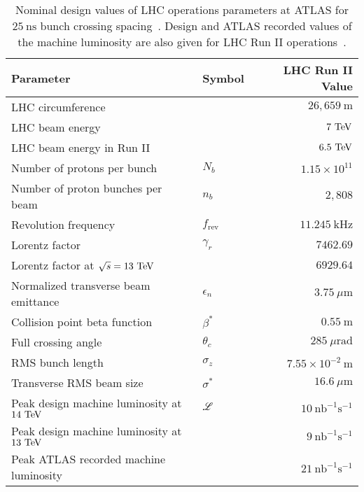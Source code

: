 \begin{table}[htpb]
 \centering
 \caption{Nominal design values of LHC operations parameters at ATLAS for $25~\textrm{ns}$ bunch crossing spacing~\cite{Evans:2008,PhysRevAccelBeams.19.101003}.
  Design and ATLAS recorded values of the machine luminosity are also given for LHC Run II operations~\cite{TWiki:2018ATLASPeakLumi}.
 }
 \begin{tabular}{@{}llr@{}} \toprule
  Parameter                                   & Symbol             & LHC Run II Value                     \\ \midrule
  LHC circumference                           &                    & $26,659~\mathrm{m}$                  \\
  LHC beam energy                             &                    & $7~\mathrm{TeV}$                             \\
  LHC beam energy in Run II                   &                    & $6.5~\mathrm{TeV}$                           \\
  Number of protons per bunch                 & $N_{b}$            & $1.15 \times 10^{11}$                \\
  Number of proton bunches per beam           & $n_{b}$            & $2,808$                              \\
  Revolution frequency                        & $f_{\textrm{rev}}$ & $11.245~\mathrm{kHz}$                \\
  Lorentz factor                              & $\gamma_{r}$       & $7462.69$                            \\
  Lorentz factor at $\sqrt{s} = 13~\mathrm{TeV}$      &                    & $6929.64$                            \\
  Normalized transverse beam emittance        & $\epsilon_{n}$     & $3.75~\mu\mathrm{m}$                 \\
  Collision point beta function               & $\beta^{*}$        & $0.55~\mathrm{m}$                    \\
  Full crossing angle                         & $\theta_{c}$       & $285~\mu\mathrm{rad}$                \\
  RMS bunch length                            & $\sigma_{z}$       & $7.55\times 10^{-2}~\mathrm{m}$      \\
  Transverse RMS beam size                    & $\sigma^{*}$       & $16.6~\mu\mathrm{m}$                 \\ \midrule
  Peak design machine luminosity at $14~\mathrm{TeV}$ & $\mathscr{L}$      & $10~\mathrm{nb}^{-1}\mathrm{s}^{-1}$ \\
  Peak design machine luminosity at $13~\mathrm{TeV}$ &                    & $9~\mathrm{nb}^{-1}\mathrm{s}^{-1}$  \\
  Peak ATLAS recorded machine luminosity      &                    & $21~\mathrm{nb}^{-1}\mathrm{s}^{-1}$ \\
  \bottomrule
 \end{tabular}\label{table:LHC_collider_parameters}%
\end{table}

